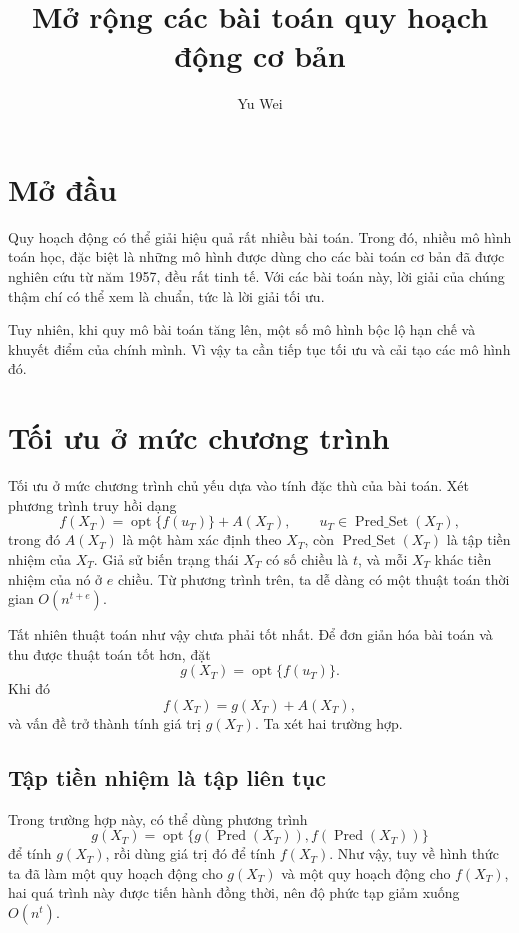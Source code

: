 \documentclass[11pt]{article}
\title{Mở rộng các bài toán quy hoạch động cơ bản}
\author{Yu Wei}
\date{}
\begin{document}
\maketitle


\section{Mở đầu}

Quy hoạch động có thể giải hiệu quả rất nhiều bài toán. Trong đó, nhiều mô
hình toán học, đặc biệt là những mô hình được dùng cho các bài toán cơ bản đã
được nghiên cứu từ năm 1957, đều rất tinh tế. Với các bài toán này, lời giải
của chúng thậm chí có thể xem là chuẩn, tức là lời giải tối ưu.

Tuy nhiên, khi quy mô bài toán tăng lên, một số mô hình bộc lộ hạn chế và
khuyết điểm của chính mình. Vì vậy ta cần tiếp tục tối ưu và cải tạo các mô
hình đó.

\section{Tối ưu ở mức chương trình}

Tối ưu ở mức chương trình chủ yếu dựa vào tính đặc thù của bài toán. Xét
phương trình truy hồi dạng
\[
  f(X_T)=\operatorname{opt}\{f(u_T)\}+A(X_T),
  \qquad u_T\in \operatorname{Pred\_Set}(X_T),
\]
trong đó \(A(X_T)\) là một hàm xác định theo \(X_T\), còn
\(\operatorname{Pred\_Set}(X_T)\) là tập tiền nhiệm của \(X_T\). Giả sử biến
trạng thái \(X_T\) có số chiều là \(t\), và mỗi \(X_T\) khác tiền nhiệm của nó
ở \(e\) chiều. Từ phương trình trên, ta dễ dàng có một thuật toán thời gian
\(O(n^{t+e})\).

Tất nhiên thuật toán như vậy chưa phải tốt nhất. Để đơn giản hóa bài toán và
thu được thuật toán tốt hơn, đặt
\[
  g(X_T)=\operatorname{opt}\{f(u_T)\}.
\]
Khi đó
\[
  f(X_T)=g(X_T)+A(X_T),
\]
và vấn đề trở thành tính giá trị \(g(X_T)\). Ta xét hai trường hợp.

\subsection{Tập tiền nhiệm là tập liên tục}

Trong trường hợp này, có thể dùng phương trình
\[
  g(X_T)=\operatorname{opt}\{g(\operatorname{Pred}(X_T)),
  f(\operatorname{Pred}(X_T))\}
\]
để tính \(g(X_T)\), rồi dùng giá trị đó để tính \(f(X_T)\). Như vậy, tuy về
hình thức ta đã làm một quy hoạch động cho \(g(X_T)\) và một quy hoạch động
cho \(f(X_T)\), hai quá trình này được tiến hành đồng thời, nên độ phức tạp
giảm xuống \(O(n^t)\).
\end{document}
